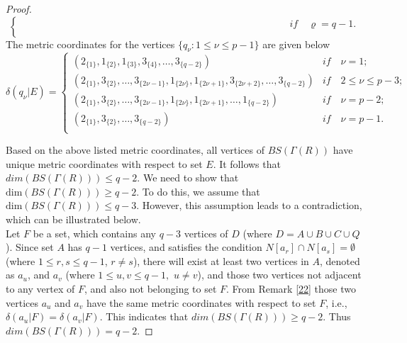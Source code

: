 \documentclass[]{interact}
\theoremstyle{plain}%
\theoremstyle{definition}
\theoremstyle{remark}
\begin{document}
\begin{proof}
\begin{equation*}
\begin{cases}
                    \qquad \qquad \qquad \qquad \qquad \qquad \qquad \qquad \qquad  \qquad \qquad\qquad\qquad\quad\textit{if}\quad\varrho= q-1.\\
                    \end{cases}
                    \end{equation*}
                    \noindent The metric coordinates for the vertices 
                     $\{q_\nu:1\leq \nu\leq {p-1} \}$ are given below
                        \begin{equation*}
                        \delta(q_{\nu}|E)=
                   \begin{cases}
                   (2_{\{1\}},1_{\{2\}}, 1_{\{3\}}, 3_{\{4\}},\ldots,3_{\{q-2\}})&\textit{if}\quad  \nu=1 ;\\
                   (2_{\{1\}},3_{\{2\}}, \ldots,  3_{\{2\nu-1\}},1_{\{2\nu\}},1_{\{2\nu+1\}},3_{\{2\nu+2\}},\ldots,3_{\{q-2\}})&\textit{if}\quad  2 \leq \nu  \leq p-3 ;\\
                     (2_{\{1\}},3_{\{2\}}, \ldots, 3_{\{2\nu-1\}},1_{\{2\nu\}},1_{\{2\nu+1\}},\ldots,1_{\{q-2\}})&\textit{if}\quad  \nu= p-2 ;\\
                     (2_{\{1\}},3_{\{2\}}, \ldots, 3_{\{q-2\}})&\textit{if}\quad  \nu= p-1.\\
                     \end{cases}
                     \end{equation*}

 \noindent Based on the above listed metric coordinates, all vertices of $BS(\Gamma(R))$ have unique metric coordinates with respect to set $E$. It follows that $dim(BS(\Gamma(R)))\leq q-2$.
We need to show that \( \text{dim}(BS(\Gamma(R))) \geq q-2 \). To do this, we assume that \( \text{dim}(BS(\Gamma(R))) \leq q-3 \). However, this assumption leads to a contradiction, which can be illustrated below.\\

\noindent Let $F$ be a set, which contains any $q-3$ vertices of $D$ (where $D= A\cup B \cup C  \cup Q $). Since set $A$ has $q-1$ vertices, and satisfies the condition $N[a_r]\cap  N[a_s]=\emptyset $ (where $1\leq r, s \leq q-1$, $r\neq s$), there will exist at least two vertices in $A$, denoted as $a_u $, and $a_v $ (where $1\leq u, v \leq q-1, $ $u \neq v$), and those two vertices not adjacent to any vertex of $F$, and also not belonging to set $F$. From Remark \ref{22} those two vertices $a_u $ and $a_v $ have the same metric coordinates with respect to set $F$, i.e.,      
 $\delta(a_{u}|F) =\delta(a_{v}|F)$.
 This indicates that $dim(BS(\Gamma(R)))\geq q-2$. Thus $dim(BS(\Gamma(R)))= q-2.$ 
\end{proof}
\end{document}
